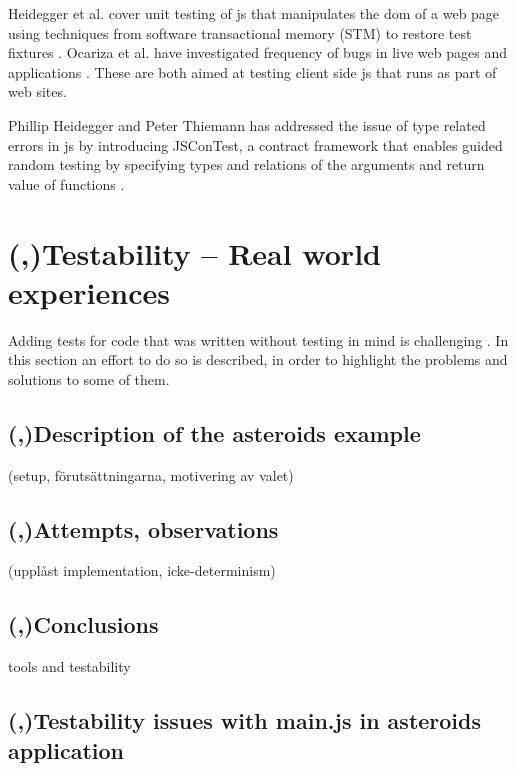 \documentclass[11pt]{article}
\begin{document}
Heidegger et al. cover unit testing of \gls{js} that manipulates the \gls{dom} of a web page using techniques from software transactional memory (STM) to restore test fixtures \cite{DOMJavascript}. Ocariza et al. have investigated frequency of bugs in live web pages and applications \cite{Wild}. These are both aimed at testing client side \gls{js} that runs as part of web sites.

Phillip Heidegger and Peter Thiemann has addressed the issue of type related errors in \gls{js} by introducing JSConTest, a contract framework that enables guided random testing by specifying types and relations of the arguments and return value of functions \cite{ContractTesting}.


\section{(,)Testability -- Real world experiences}
\label{sec:testability}

Adding tests for code that was written without testing in mind is challenging \cite[p.~18]{Tddjs}. In this section an effort to do so is described, in order to highlight the problems and solutions to some of them.

\subsection{(,)Description of the asteroids example}

(setup, förutsättningarna, motivering av valet)

\subsection{(,)Attempts, observations}

(upplåst implementation, icke-determinism)

\subsection{(,)Conclusions}

tools and testability

\subsection{(,)Testability issues with main.js in asteroids application}
\label{subsec:asteroids}
\end{document}
